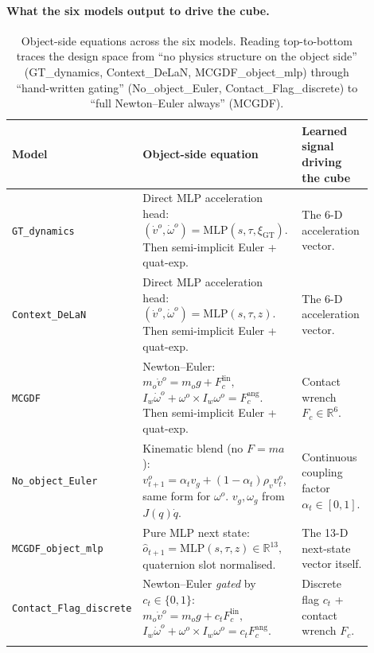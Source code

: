 \documentclass[11pt]{article}
\begin{document}
\paragraph{What the six models output to drive the cube.}
\begin{longtable}{p{0.18\linewidth} p{0.50\linewidth} p{0.22\linewidth}}
\toprule
Model & Object-side equation & Learned signal driving the cube \\
\midrule
\texttt{GT\_dynamics} &
    Direct MLP acceleration head:
    \(
      (\dot v^o, \dot \omega^o) = \mathrm{MLP}(s, \tau, \xi_{\mathrm{GT}})
    \).
    Then semi-implicit Euler + quat-exp.
    & The 6-D acceleration vector. \\
\texttt{Context\_DeLaN} &
    Direct MLP acceleration head:
    \(
      (\dot v^o, \dot \omega^o) = \mathrm{MLP}(s, \tau, z)
    \).
    Then semi-implicit Euler + quat-exp.
    & The 6-D acceleration vector. \\
\texttt{MCGDF} &
    Newton--Euler:
    \(
      m_o \dot v^o = m_o g + F_c^{\mathrm{lin}},
    \)
    \(
      I_w \dot \omega^o + \omega^o \times I_w \omega^o = F_c^{\mathrm{ang}}.
    \)
    Then semi-implicit Euler + quat-exp.
    & Contact wrench $F_c \in \mathbb{R}^{6}$. \\
\texttt{No\_object\_Euler} &
    Kinematic blend (no $F = ma$):
    \(
      v^o_{t+1} = \alpha_t v_g + (1-\alpha_t) \rho_v v^o_t
    \),
    same form for $\omega^o$.  $v_g, \omega_g$ from $J(q)\dot q$.
    & Continuous coupling factor $\alpha_t \in [0, 1]$. \\
\texttt{MCGDF\_object\_mlp} &
    Pure MLP next state:
    \(
      \hat o_{t+1} = \mathrm{MLP}(s, \tau, z) \in \mathbb{R}^{13},
    \)
    quaternion slot normalised.
    & The 13-D next-state vector itself. \\
\texttt{Contact\_Flag\_discrete} &
    Newton--Euler \emph{gated} by $c_t \in \{0, 1\}$:
    \(
      m_o \dot v^o = m_o g + c_t F_c^{\mathrm{lin}},
    \)
    \(
      I_w \dot \omega^o + \omega^o \times I_w \omega^o = c_t F_c^{\mathrm{ang}}.
    \)
    & Discrete flag $c_t$ + contact wrench $F_c$. \\
\bottomrule
\caption{Object-side equations across the six models.  Reading
top-to-bottom traces the design space from ``no physics structure on
the object side'' (GT\_dynamics, Context\_DeLaN, MCGDF\_object\_mlp)
through ``hand-written gating'' (No\_object\_Euler,
Contact\_Flag\_discrete) to ``full Newton--Euler always'' (MCGDF).}
\label{tab:cmp-object}
\end{longtable}
\end{document}
